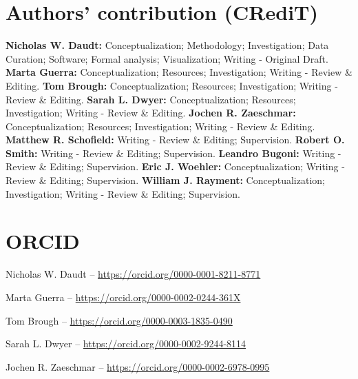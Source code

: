 \documentclass[preprint, 3p, authoryear]{elsarticle} %
\begin{document}




\newpage

\hypertarget{authors-contribution-credit}{%
\section*{Authors' contribution (CRediT)}\label{authors-contribution-credit}}

\textbf{Nicholas W. Daudt:} Conceptualization; Methodology; Investigation; Data Curation; Software; Formal analysis; Visualization; Writing - Original Draft. \textbf{Marta Guerra:} Conceptualization; Resources; Investigation; Writing - Review \& Editing. \textbf{Tom Brough:} Conceptualization; Resources; Investigation; Writing - Review \& Editing. \textbf{Sarah L. Dwyer:} Conceptualization; Resources; Investigation; Writing - Review \& Editing. \textbf{Jochen R. Zaeschmar:} Conceptualization; Resources; Investigation; Writing - Review \& Editing. \textbf{Matthew R. Schofield:} Writing - Review \& Editing; Supervision. \textbf{Robert O. Smith:} Writing - Review \& Editing; Supervision. \textbf{Leandro Bugoni:} Writing - Review \& Editing; Supervision. \textbf{Eric J. Woehler:} Conceptualization; Writing - Review \& Editing; Supervision. \textbf{William J. Rayment:} Conceptualization; Investigation; Writing - Review \& Editing; Supervision.

\hypertarget{orcid}{%
\section*{ORCID}\label{orcid}}

Nicholas W. Daudt -- \url{https://orcid.org/0000-0001-8211-8771}

Marta Guerra -- \url{https://orcid.org/0000-0002-0244-361X}

Tom Brough -- \url{https://orcid.org/0000-0003-1835-0490}

Sarah L. Dwyer -- \url{https://orcid.org/0000-0002-9244-8114}

Jochen R. Zaeschmar -- \url{https://orcid.org/0000-0002-6978-0995}
\end{document}
